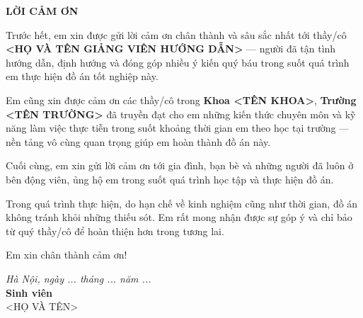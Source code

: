 \documentclass[../DoAn]{subfiles}
\begin{document}
\begin{center}
    \textbf{\Large LỜI CẢM ƠN}
\end{center}

\vspace{1cm}


Trước hết, em xin được gửi lời cảm ơn chân thành và sâu sắc nhất tới thầy/cô \textbf{<HỌ VÀ TÊN GIẢNG VIÊN HƯỚNG DẪN>} — người đã tận tình hướng dẫn, định hướng và đóng góp nhiều ý kiến quý báu trong suốt quá trình em thực hiện đồ án tốt nghiệp này.

Em cũng xin được cảm ơn các thầy/cô trong \textbf{Khoa <TÊN KHOA>}, \textbf{Trường <TÊN TRƯỜNG>} đã truyền đạt cho em những kiến thức chuyên môn và kỹ năng làm việc thực tiễn trong suốt khoảng thời gian em theo học tại trường — nền tảng vô cùng quan trọng giúp em hoàn thành đồ án này.

Cuối cùng, em xin gửi lời cảm ơn tới gia đình, bạn bè và những người đã luôn ở bên động viên, ủng hộ em trong suốt quá trình học tập và thực hiện đồ án.

Trong quá trình thực hiện, do hạn chế về kinh nghiệm cũng như thời gian, đồ án không tránh khỏi những thiếu sót. Em rất mong nhận được sự góp ý và chỉ bảo từ quý thầy/cô để hoàn thiện hơn trong tương lai.

Em xin chân thành cảm ơn!

\vspace{1cm}
\begin{flushright}
    \textit{Hà Nội, ngày ... tháng ... năm ...} \\
    \textbf{Sinh viên} \\
    \vspace{2cm}
    <HỌ VÀ TÊN>
\end{flushright}
\end{document}
